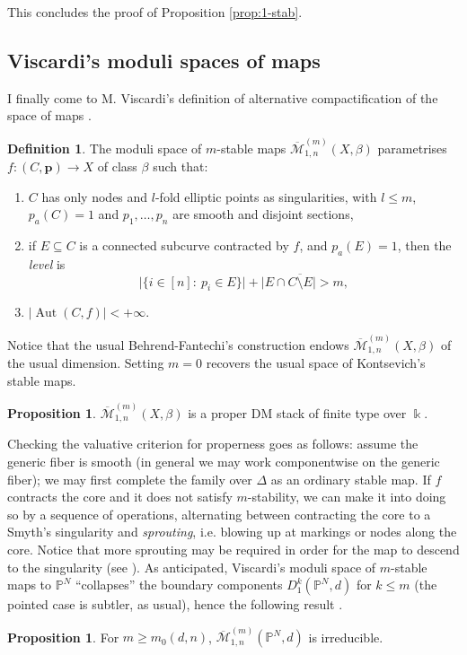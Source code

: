 \documentclass[11pt]{amsart}
\newcommand{\oM}{\overline{\mathcal{M}}}
\newcommand{\PP}{\mathbb P}
\renewcommand{\to}{\rightarrow}
\newcommand{\kk}{\Bbbk}
\newcommand{\Aut}{\operatorname{Aut}}
\newcommand{\dvr}{\Delta}
\theoremstyle{definition}
\newtheorem{prop}[thm]{Proposition}
\theoremstyle{definition}
\newtheorem{dfn}[thm]{Definition}
\begin{document}
This concludes the proof of Proposition \ref{prop:1-stab}. 
\subsection{Viscardi's moduli spaces of maps} I finally come to M. Viscardi's definition of alternative compactification of the space of maps \cite[Definition 2.15]{VISC}.

\begin{dfn}
 The moduli space of $m$-stable maps $\oM^{(m)}_{1,n}(X,\beta)$ parametrises $f\colon (C,\mathbf p)\to X$ of class $\beta$ such that:\begin{enumerate}
                                                                                                                                      \item $C$ has only nodes and $l$-fold elliptic points as singularities, with $l\leq m$, $p_a(C)=1$ and $p_1,\ldots,p_n$ are smooth and disjoint sections,
                                                                                                                                      \item if $E\subseteq C$ is a connected subcurve contracted by $f$, and $p_a(E)=1$, then the \emph{level} is \[\lvert \{i\in[n]:\ p_i\in E\}\rvert+\lvert E\cap \overline{C\setminus E}\rvert >m,\]
                                                                                                                                      \item $\lvert\Aut(C,f)\rvert<+\infty$.
                                                                                                                                     \end{enumerate}

\end{dfn}
Notice that the usual Behrend-Fantechi's construction \cite[Proposition 6.2]{BF} endows $\oM^{(m)}_{1,n}(X,\beta)$ of the usual dimension. Setting $m=0$ recovers the usual space of Kontsevich's stable maps.

\begin{prop}\cite[Theorem 3.6]{VISC}
 $\oM^{(m)}_{1,n}(X,\beta)$ is a proper DM stack of finite type over $\kk$.
\end{prop}
Checking the valuative criterion for properness goes as follows: assume the generic fiber is smooth (in general we may work componentwise on the generic fiber); we may first complete the family over $\dvr$ as an ordinary stable map. If $f$ contracts the core and it does not satisfy $m$-stability, we can make it into doing so by a sequence of operations, alternating between contracting the core to a Smyth's singularity and \emph{sprouting}, i.e. blowing up at markings or nodes along the core. Notice that more sprouting may be required in order for the map to descend to the singularity (see \cite[Remark 2.6]{BCM}). As anticipated, Viscardi's moduli space of $m$-stable maps to $\PP^N$ ``collapses'' the boundary components $D^k_1(\PP^N,d)$ for $k\leq m$ (the pointed case is subtler, as usual), hence the following result \cite[Corollary 5.10]{VISC}.
\begin{prop}
 For $m\geq m_0(d,n)$, $\oM^{(m)}_{1,n}(\PP^N,d)$ is irreducible.
\end{prop}
\end{document}

